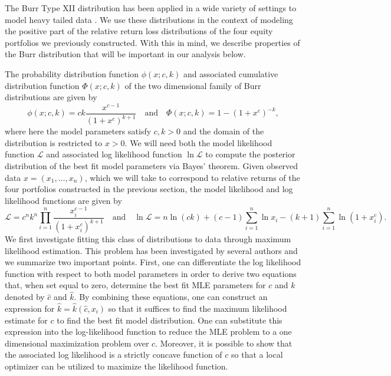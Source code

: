 \documentclass{amsart}
\begin{document}
The Burr Type XII distribution \cite{Burr-42} has been applied in a 
wide variety of settings to model 
heavy tailed data \cite{Rodriguez-77, Soliman-05, Tadikamalla-80}.  We 
use these distributions in the context of modeling the positive part 
of the relative return loss distributions of the four equity portfolios we previously constructed. 
With this in mind, we describe properties of the Burr distribution 
that will be important in our analysis below. 

The probability distribution function $\phi(x;c,k)$ and 
associated cumulative distribution function $\Phi(x;c,k)$ of the two dimensional family of 
Burr distributions are given by 
\begin{equation}
    \phi(x;c,k)=c k \frac{x^{c-1}}{(1+x^c)^{k+1}} 
    \quad\mathrm{and}\quad \Phi(x;c,k) = 1-\left(1+x^c\right)^{-k},
    \label{burrdis}
\end{equation}
%
where here the model parameters satisfy $c,k>0$ and the domain of the 
distribution is restricted to $x>0$.  We will need both the model 
likelihood function $\mathcal{L}$ and associated log likelihood function $\ln\mathcal{L}$
to compute the posterior distribution of the best fit model parameters via Bayes' theorem.
Given observed data $x=(x_1,\ldots,x_n)$, which we will take to correspond to relative returns of 
the four portfolios constructed in the previous section, 
the model likelihood and log likelihood functions are given by 
%
\begin{equation}
    \mathcal{L} = c^nk^n\prod_{i=1}^n\frac{x_i^{c-1}}{(1+x_i^c)^{k+1}} \quad\mathrm{and} 
    \quad \ln\mathcal{L} = n\ln(ck) + (c-1)\sum_{i=1}^n\ln x_i
    -(k+1)\sum_{i=1}^n\ln(1+x_i^c).
    \label{burlog}
\end{equation}
%
We first investigate fitting this class of distributions to data through maximum 
likelihood estimation.  This problem has been investigated by several 
authors \cite{Shao-02,Wingo-93,Wingo-93-2} and we summarize two important points. 
First, one can differentiate the log likelihood function with 
respect to both model parameters in order to derive two equations that, when set equal to zero, 
determine the best fit MLE parameters for $c$ and $k$  denoted by 
$\hat{c}$ and $\hat{k}$. By combining these equations, one can construct an 
expression for $\hat{k}=\hat{k}(\hat{c},x_i)$ so that it suffices to find the 
maximum likelihood estimate for $c$ to find the best fit model distribution. 
One can substitute this expression into the log-likelihood function to reduce 
the MLE problem to a one dimensional maximization problem over $c$. Moreover, 
it is possible to show that the associated log likelihood is a strictly 
concave function of $c$ so that a local optimizer can be utilized to 
maximize the likelihood function.
\end{document}
